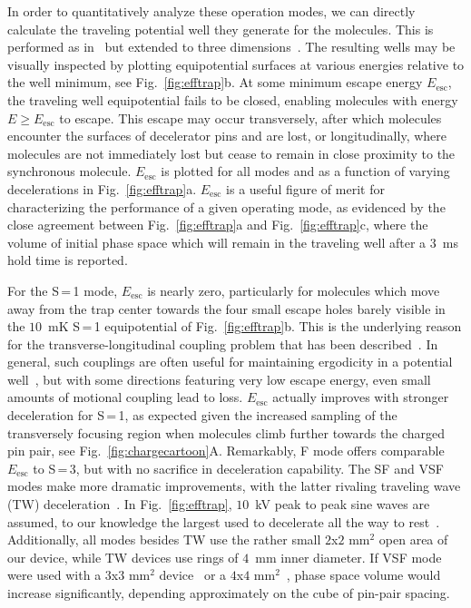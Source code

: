 \documentclass[%
 reprint,
 amsmath,amssymb,
 aps,
prl,
]{revtex4-1}
\begin{document}
In order to quantitatively analyze these operation modes, we can directly calculate the traveling potential well they generate for the molecules.
This is performed as in~\cite{Bethlem2000,Hudson2004} but extended to three dimensions~\cite{ssm}.
The resulting wells may be visually inspected by plotting equipotential surfaces at various energies relative to the well minimum, see Fig.~\ref{fig:efftrap}b.
At some minimum escape energy $E_\text{esc}$, the traveling well equipotential fails to be closed, enabling molecules with energy $E\ge E_\text{esc}$ to escape. 
This escape may occur transversely, after which molecules encounter the surfaces of decelerator pins and are lost, or longitudinally, where molecules are not immediately lost but cease to remain in close proximity to the synchronous molecule.
$E_\text{esc}$ is plotted for all modes and as a function of varying decelerations in Fig.~\ref{fig:efftrap}a.
$E_\text{esc}$ is a useful figure of merit for characterizing the performance of a given operating mode, as evidenced by the close agreement between Fig.~\ref{fig:efftrap}a and Fig.~\ref{fig:efftrap}c, where the volume of initial phase space which will remain in the traveling well after a $3$~ms hold time is reported.

For the S\,=\,1 mode, $E_\text{esc}$ is nearly zero, particularly for molecules which move away from the trap center towards the four small escape holes barely visible in the $10$~mK S\,=\,1 equipotential of Fig.~\ref{fig:efftrap}b. 
This is the underlying reason for the transverse-longitudinal coupling problem that has been described~\cite{VanDeMeerakker2006}.
In general, such couplings are often useful for maintaining ergodicity in a potential well~\cite{Surkov1996}, but with some directions featuring very low escape energy, even small amounts of motional coupling lead to loss.
$E_\text{esc}$ actually improves with stronger deceleration for S\,=\,1, as expected given the increased sampling of the transversely focusing region when molecules climb further towards the charged pin pair, see Fig.~\ref{fig:chargecartoon}A.
Remarkably, F mode offers comparable $E_\text{esc}$ to S\,=\,3, but with no sacrifice in deceleration capability.
The SF and VSF modes make more dramatic improvements, with the latter rivaling traveling wave (TW) deceleration~\cite{Osterwalder2010}. 
In Fig.~\ref{fig:efftrap}, $10$~kV peak to peak sine waves are assumed, to our knowledge the largest used to decelerate all the way to rest~\cite{Quintero-Perez2013}.
Additionally, all modes besides TW use the rather small $2$x$2\text{ mm}^2$ open area of our device, while TW devices use rings of $4$~mm inner diameter.
If VSF mode were used with a $3$x$3\text{ mm}^2$ device~\cite{Scharfenberg2009} or a $4$x$4\text{ mm}^2$~\cite{VandeMeerakker2005}, phase space volume would increase significantly, depending approximately on the cube of pin-pair spacing. 
\end{document}
